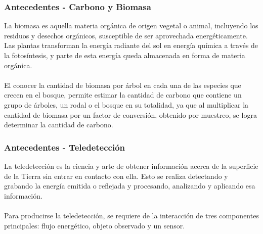 \documentclass[xcolor=table]{beamer}
\begin{document}
\begin{frame}\frametitle{Antecedentes - Carbono y Biomasa}

La biomasa es aquella materia org\'anica de origen vegetal o animal, incluyendo los residuos y desechos org\'anicos, susceptible de ser aprovechada energ\'eticamente. Las plantas transforman la energ\'ia radiante del sol en energ\'ia qu\'imica a trav\'es de la fotos\'intesis, y parte de esta energ\'ia queda almacenada en forma de materia org\'anica.\\~\\
El conocer la cantidad de biomasa por \'arbol en cada una de las especies que crecen en el bosque, permite estimar la cantidad de carbono que contiene un grupo de \'arboles, un rodal o el bosque en su totalidad, ya que al multiplicar la cantidad de biomasa por un factor de conversi\'on, obtenido por muestreo, se logra determinar la cantidad de carbono.

\end{frame}
\begin{frame}\frametitle{Antecedentes - Teledetecci\'on}

		La teledetecci\'on es la ciencia y arte de obtener informaci\'on acerca de la superficie de la Tierra sin entrar en contacto con ella. Esto se realiza detectando y grabando la energ\'ia emitida o reflejada y procesando, analizando y aplicando esa informaci\'on.\\~\\
		Para producirse la teledetecci\'on, se requiere de la interacci\'on de tres componentes principales: flujo energ\'etico, objeto observado y un sensor.

\end{frame}
\end{document}
